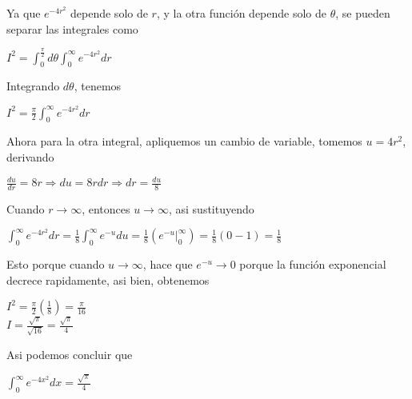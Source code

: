 Ya que $e^{-4r^2}$ depende solo de $r$, y la otra función depende solo de $\theta$, se pueden separar las integrales como\begin{center}
    $I^2 = \displaystyle\int_{0}^{\frac{\pi}{2}} d\theta \displaystyle\int_{0}^{\infty} e^{-4r^2} dr$
\end{center}Integrando $d\theta$, tenemos\begin{center}
    $\displaystyle I^2 = \frac{\pi}{2} \int_{0}^{\infty} e^{-4r^2} dr$
\end{center}Ahora para la otra integral, apliquemos un cambio de variable, tomemos $u = 4r^2$, derivando\begin{center}
    $\displaystyle\frac{du}{dr} = 8r\Rightarrow du = 8rdr\Rightarrow \displaystyle dr = \frac{du}{8}$
\end{center}Cuando $r\rightarrow\infty$, entonces $u\rightarrow\infty$, asi sustituyendo\begin{center}
    $\displaystyle\int_{0}^{\infty} e^{-4r^2} dr = \frac{1}{8} \int_{0}^{\infty} e^{-u} du = \frac{1}{8} \left ( e^{-u} |_{0}^{\infty} \right ) = \frac{1}{8}\left ( 0-1 \right ) = \frac{1}{8}$
\end{center}Esto porque cuando $u\rightarrow\infty$, hace que $e^{-u}\rightarrow 0$ porque la función exponencial decrece rapidamente, asi bien, obtenemos\begin{center}
    $I^2 = \displaystyle\frac{\pi}{2} \left ( \frac{1}{8} \right ) = \frac{\pi}{16}$\\
    \vspace{0.3cm}
    $I = \displaystyle\frac{\sqrt{\pi}}{\sqrt{16}} = \displaystyle\frac{\sqrt{\pi}}{4}$
\end{center}Asi podemos concluir que\begin{center}
    $\displaystyle\int_{0}^{\infty} e^{-4x^2} dx = \displaystyle\frac{\sqrt{\pi}}{4}$
\end{center}
